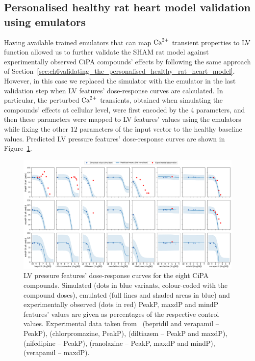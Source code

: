 \subsection{Personalised healthy rat heart model validation using emulators}\label{sec:ch7personalised_healthy_rat_model_validation_using_emulators}
Having available trained emulators that can map $\textrm{Ca}^{2+}$ transient properties to LV function allowed us to further validate the SHAM rat model against experimentally observed CiPA compounds' effects by following the same approach of Section~\ref{sec:ch6validating_the_personalised_healthy_rat_heart_model}. However, in this case we replaced the simulator with the emulator in the last validation step when LV features' dose-response curves are calculated. In particular, the perturbed $\textrm{Ca}^{2+}$ transients, obtained when simulating the compounds' effects at cellular level, were first encoded by the $4$ parameters, and then these parameters were mapped to LV features' values using the emulators while fixing the other $12$ parameters of the input vector to the healthy baseline values. Predicted LV pressure features' dose-response curves are shown in Figure~\ref{fig:LVfeatsalldrugsrespcurves}.

\begin{figure}[ht!]
    \myfloatalign
    \includegraphics[width=\textwidth]{figures/chapter07/simulated_and_emulated_cipa_compounds_effects_on_lv_pressure_features_with_exp_data.pdf}
    \caption{LV pressure features' dose-response curves for the eight CiPA compounds. Simulated (dots in blue variants, colour-coded with the compound doses), emulated (full lines and shaded areas in blue) and experimentally observed (dots in red) PeakP, maxdP and mindP features' values are given as percentages of the respective control values. Experimental data taken from~\cite{Amsterdam:1988} (bepridil and verapamil -- PeakP), \cite{Langslet:1971} (chlorpromazine, PeakP), \cite{Koltai:1989} (diltiazem -- PeakP and maxdP), \cite{Saponara:2007} (nifedipine -- PeakP), \cite{Wang:2007} (ranolazine -- PeakP, maxdP and mindP), \cite{Kolar:1990} (verapamil -- maxdP).}
    \label{fig:LVfeatsalldrugsrespcurves}
\end{figure}

